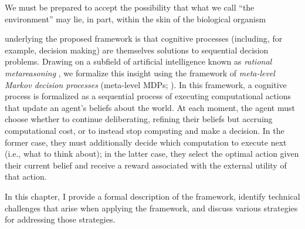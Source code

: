 \begin{savequote}[75mm]
We must be prepared to accept the possibility that what we call ``the environment'' may lie, in part, within the skin of the biological organism
\end{savequote}


 underlying the proposed framework is that cognitive processes (including, for example, decision making) are themselves solutions to sequential decision problems. Drawing on a subfield of artificial intelligence known as \emph{rational metareasoning} \citep{matheson1968economic,russell1991principles}, we formalize this insight using the framework of \emph{meta-level Markov decision processes} (meta-level MDPs; \citealp{hay2012selecting}). In this framework, a cognitive process is formalized as a sequential process of executing computational actions that update an agent's beliefs about the world. At each moment, the agent must choose whether to continue deliberating, refining their beliefs but accruing computational cost, or to instead stop computing and make a decision. In the former case, they must additionally decide which computation to execute next (i.e., what to think about); in the latter case, they select the optimal action given their current belief and receive a reward associated with the external utility of that action.

In this chapter, I provide a formal description of the framework, identify technical challenges that arise when applying the framework, and discuss various strategies for addressing those strategies.



